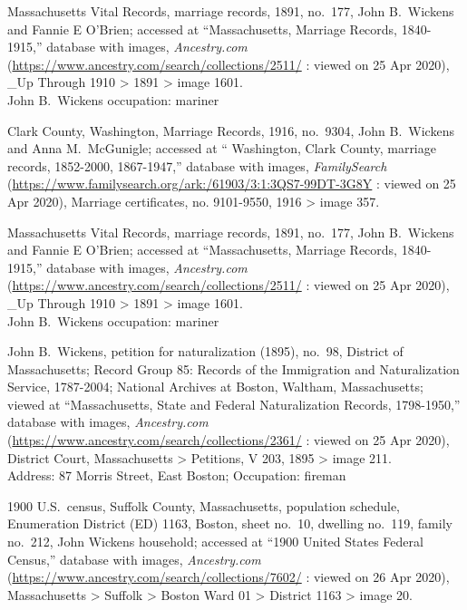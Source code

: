 \begin{thebibliography}{999}
Massachusetts Vital Records, marriage records, 1891, no.\ 177, John B.\ Wickens and Fannie E O'Brien; accessed at ``Massachusetts, Marriage Records, 1840-1915,'' database with images, \textit{Ancestry.com} (\url{https://www.ancestry.com/search/collections/2511/} : viewed on 25 Apr 2020), \_Up Through 1910 > 1891 > image 1601.\\
John B.\ Wickens occupation: mariner

Clark County, Washington, Marriage Records, 1916, no.\ 9304, John B.\ Wickens and Anna M.\ McGunigle; accessed at `` Washington, Clark County, marriage records, 1852-2000, 1867-1947,'' database with images, \textit{FamilySearch} (\url{https://www.familysearch.org/ark:/61903/3:1:3QS7-99DT-3G8Y} : viewed on 25 Apr 2020), Marriage certificates, no. 9101-9550, 1916 > image 357.

Massachusetts Vital Records, marriage records, 1891, no.\ 177, John B.\ Wickens and Fannie E O'Brien; accessed at ``Massachusetts, Marriage Records, 1840-1915,'' database with images, \textit{Ancestry.com} (\url{https://www.ancestry.com/search/collections/2511/} : viewed on 25 Apr 2020), \_Up Through 1910 > 1891 > image 1601.\\
John B.\ Wickens occupation: mariner

John B.\ Wickens, petition for naturalization (1895), no.\ 98, District of Massachusetts; Record Group 85: Records of the Immigration and Naturalization Service, 1787-2004; National Archives at Boston, Waltham, Massachusetts; viewed at ``Massachusetts, State and Federal Naturalization Records, 1798-1950,'' database with images, \textit{Ancestry.com} (\url{https://www.ancestry.com/search/collections/2361/} : viewed on 25 Apr 2020), District Court, Massachusetts > Petitions, V 203, 1895 > image 211.\\
Address: 87 Morris Street, East Boston; Occupation: fireman

1900 U.S.\ census, Suffolk County, Massachusetts, population schedule, Enumeration District (ED) 1163,  Boston, sheet no.\ 10, dwelling no.\ 119, family no.\ 212, John Wickens household; accessed at ``1900 United States Federal Census,'' database with images, \textit{Ancestry.com} (\url{https://www.ancestry.com/search/collections/7602/} : viewed on 26 Apr 2020), Massachusetts > Suffolk > Boston Ward 01 > District 1163 > image 20.


\end{thebibliography}
